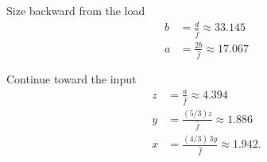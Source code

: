 \documentclass[a4paper,11pt]{article}
\begin{document}
\begin{minipage}{\linewidth}
\begin{notepanels}[gap=8mm]
\begin{notepanel}{Size backward from the load}
\[\begin{aligned}
                b&=\frac{d}{\hat f}\approx33.145 \\
                a&=\frac{2b}{\hat f}\approx17.067
            \end{aligned}\]
        \end{notepanel}
        \begin{notepanel}{Continue toward the input}
            \[\begin{aligned}
                z&=\frac{a}{\hat f}\approx4.394 \\
                y&=\frac{(5/3)z}{\hat f}\approx1.886 \\
                x&=\frac{(4/3)\,3y}{\hat f}\approx1.942.
            \end{aligned}\]
        \end{notepanel}
    \end{notepanels}
\end{minipage}
\end{document}

